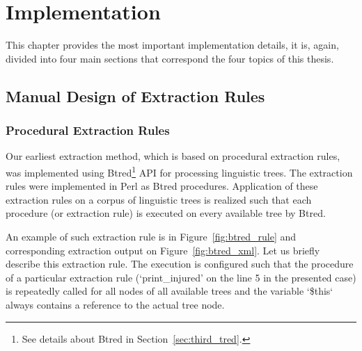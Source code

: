 \chapter{Implementation} \label{sec:ch_implementation}

This chapter provides the most important implementation details, it is, again, divided into four main sections that correspond the four topics of this thesis.

\section{Manual Design of Extraction Rules} \label{sec:manual_impl_rules} \graphicspath{{../img/ch50/}}


\subsection{Procedural Extraction Rules} \label{sec:manual_Procedural_Extraction_Rules} 

Our earliest extraction method, which is based on procedural extraction rules, was implemented using Btred\footnote{See details about Btred in Section~\ref{sec:third_tred}.} API for processing linguistic trees. The extraction rules were implemented in Perl as Btred procedures. Application of these extraction rules on a corpus of linguistic trees is realized such that each procedure (or extraction rule) is executed on every available tree by Btred. 

An example of such extraction rule is in Figure~\ref{fig:btred_rule} and corresponding extraction output on Figure~\ref{fig:btred_xml}. Let us briefly describe this extraction rule. The execution is configured such that the procedure of a particular extraction rule (`print\_injured’ on the line 5 in the presented case) is repeatedly called for all nodes of all available trees and the variable `\$this` always contains a reference to the actual tree node. 


